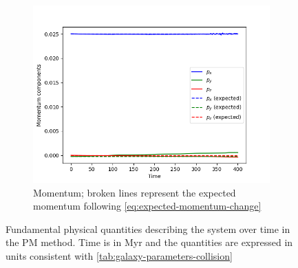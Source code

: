 \begin{figure}[H]
    \vspace{0.2cm}

    \begin{subfigure}[b]{0.5\textwidth}
        \centering
        \includegraphics[width=\textwidth]{chapters/results/img/pm-collision/momentum.png}
        \caption{Momentum; broken lines represent the expected momentum following \autoref{eq:expected-momentum-change}}
        \label{fig:physical-quantities-pm-collision-sub3}
    \end{subfigure}

    \caption{Fundamental physical quantities describing the system over time in the PM method.
        Time is in Myr and the quantities are expressed in units consistent with \autoref{tab:galaxy-parameters-collision}}
    \label{fig:physical-quantities-pm-collision}
\end{figure}

